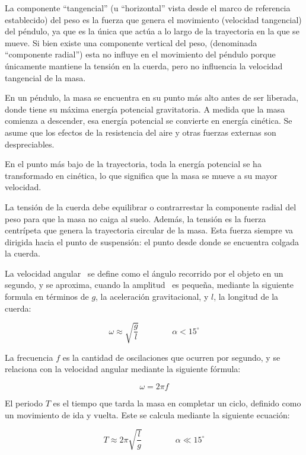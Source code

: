 \documentclass[twocolumn]{report}
\numberwithin{table}{section}
\begin{document}
La componente “tangencial” (u “horizontal” vista desde el marco de
referencia establecido) del peso es la fuerza que genera el
movimiento (velocidad tangencial) del péndulo, ya que es la única que
actúa a lo largo de la trayectoria en la que se mueve. Si bien existe
una componente vertical del peso, (denominada “componente radial”)
esta no influye en el movimiento del péndulo porque únicamente
mantiene la tensión en la cuerda, pero no influencia la velocidad
tangencial de la masa.

En un péndulo, la masa se encuentra en su punto más alto antes de ser
liberada, donde tiene su máxima energía potencial gravitatoria. A
medida que la masa comienza a descender, esa energía potencial se
convierte en energía cinética. Se asume que los efectos de la
resistencia del aire y otras fuerzas externas son despreciables.

En el punto más bajo de la trayectoria, toda la energía potencial se
ha transformado en cinética, lo que significa que la masa se mueve a
su mayor velocidad.

La tensión de la cuerda debe equilibrar o contrarrestar la componente
radial del peso para que la masa no caiga al suelo. Además, la
tensión es la fuerza centrípeta que genera la trayectoria circular de
la masa. Esta fuerza siempre va dirigida hacia el punto de
suspensión: el punto desde donde se encuentra colgada la cuerda.

La velocidad angular~\omega{} se define como el ángulo recorrido por
el objeto en un segundo, y se aproxima, cuando la amplitud~\alpha{} es
pequeña, mediante la siguiente formula en términos de $g$, la
aceleración gravitacional, y $l$, la longitud de la cuerda:

\begin{equation}
  \omega \approx \sqrt{\frac{g}{l}} \qquad\qquad \alpha < 15^{\circ}
\end{equation}

La frecuencia $f$ es la cantidad de oscilaciones que ocurren por
segundo, y se relaciona con la velocidad angular \omega{} mediante la
siguiente fórmula:

\begin{equation}
  \omega = 2 \pi f
\end{equation}

El periodo $T$ es el tiempo que tarda la masa en completar un ciclo,
definido como un movimiento de ida y vuelta. Este se calcula
mediante la siguiente ecuación:

\begin{equation}
  T \approx 2\pi\sqrt{\frac{l}{g}} \qquad\qquad \alpha \ll 15^{\circ}
  \label{eq:periodo}
\end{equation}
\end{document}
